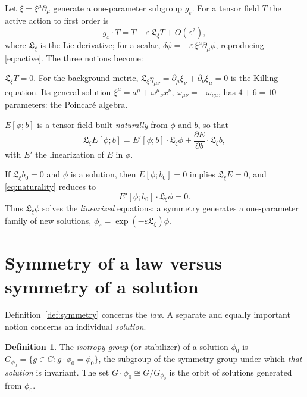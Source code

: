 \documentclass[11pt,a4paper,openany]{book}
\theoremstyle{definition}
\newtheorem{definition}{Definition}[chapter]
\theoremstyle{plain}
\theoremstyle{remark}
\newcommand{\Lie}{\mathfrak{L}}
\newcommand{\eps}{\varepsilon}
\begin{document}
Let $\xi=\xi^\mu\partial_\mu$ generate a one-parameter subgroup $g_\eps$.
For a tensor field $T$ the active action to first order is
\begin{equation}\label{eq:lie}
  g_\eps\cdot T = T-\eps\,\Lie_\xi T+O(\eps^2),
\end{equation}
where $\Lie_\xi$ is the Lie derivative; for a scalar,
$\delta\phi=-\eps\,\xi^\mu\partial_\mu\phi$, reproducing
\eqref{eq:active}. The three notions become:
\begin{description}[leftmargin=1.2em,itemsep=3pt]
\item[Invariance of an object] $\Lie_\xi T=0$. For the background metric,
  $\Lie_\xi\eta_{\mu\nu}=\partial_\mu\xi_\nu+\partial_\nu\xi_\mu=0$ is the
  Killing equation. Its general solution
  $\xi^\mu=a^\mu+\omega^\mu{}_{\nu}x^\nu$, $\omega_{\mu\nu}=-\omega_{\nu\mu}$,
  has $4+6=10$ parameters: the Poincar\'e algebra.
\item[Covariance of an equation] $E[\phi;b]$ is a tensor field built
  \emph{naturally} from $\phi$ and $b$, so that
  \begin{equation}\label{eq:naturality}
    \Lie_\xi E[\phi;b]=E'[\phi;b]\cdot\Lie_\xi\phi+\frac{\partial E}{\partial b}\cdot\Lie_\xi b,
  \end{equation}
  with $E'$ the linearization of $E$ in $\phi$.
\item[Symmetry] If $\Lie_\xi b_0=0$ and $\phi$ is a solution, then
  $E[\phi;b_0]=0$ implies $\Lie_\xi E=0$, and \eqref{eq:naturality} reduces to
  \begin{equation}\label{eq:zero-mode}
    E'[\phi;b_0]\cdot\Lie_\xi\phi=0.
  \end{equation}
  Thus $\Lie_\xi\phi$ solves the \emph{linearized} equations: a symmetry
  generates a one-parameter family of new solutions, $\phi_\eps=\exp(-\eps\Lie_\xi)\phi$.
\end{description}

\section{Symmetry of a law versus symmetry of a solution}
\label{sec:law-solution}

Definition~\ref{def:symmetry} concerns the \emph{law}. A separate and equally
important notion concerns an individual \emph{solution}.

\begin{definition}\label{def:isotropy}
The \emph{isotropy group} (or stabilizer) of a solution $\phi_0$ is
$G_{\phi_0}=\{g\in G: g\cdot\phi_0=\phi_0\}$, the subgroup of the symmetry group
under which \emph{that solution} is invariant. The set $G\cdot\phi_0
\cong G/G_{\phi_0}$ is the orbit of solutions generated from $\phi_0$.
\end{definition}
\end{document}
